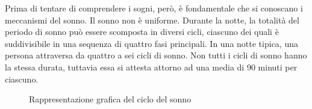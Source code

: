 Prima di tentare di comprendere i sogni, però, è fondamentale che si conoscano i meccanismi del sonno.
Il sonno non è uniforme.
Durante la notte, la totalità del periodo di sonno può essere scomposta in diversi cicli, ciascuno dei quali è
suddivisibile in una sequenza di quattro fasi principali.
In una notte tipica, una persona attraversa da quattro a sei cicli di sonno.
Non tutti i cicli di sonno hanno la stessa durata, tuttavia essa si attesta attorno ad una media di 90 minuti per
ciascuno.

\begin{figure}[t]
    \centering
    
    \vspace{-10pt}
    \caption{Rappresentazione grafica del ciclo del sonno}
    \label{fig:sleep-cycle}
\end{figure}

